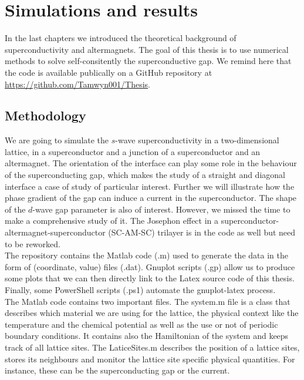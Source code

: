 \documentclass[../main.tex]{subfile}
\begin{document}
\section{Simulations and results}
In the last chapters we introduced the theoretical background of superconductivity and altermagnets. 
The goal of this thesis is to use numerical methods to solve self-consitently the superconductive gap.
We remind here that the code is available publically on a GitHub repository at \url{https://github.com/Tamwyn001/Thesis}.\\

\subsection{Methodology}\label{sec:Methodology}
We are going to simulate the $s$-wave superconductivity in a two-dimensional lattice,
in a superconductor and a junction of a superconductor and an altermagnet. 
The orientation of the interface can play some role in the behaviour of the superconducting gap, which 
makes the study of a straight and diagonal interface a case of study of particular interest. 
Further we will illustrate how the phase gradient of the gap can induce a current in the superconductor.
The shape of the $d$-wave gap parameter is also of interest. However, we missed the time to make a comprehensive study of it.
The Josephon effect in a superconductor-altermagnet-superconductor (SC-AM-SC) trilayer is in the code as well but need to be reworked.\\

The repository contains the Matlab code (.m) used to generate the data in the form of (coordinate, value) files (.dat).
Gnuplot scripts (.gp) allow us to produce some plots that we can then directly link to the Latex source code
of this thesis. Finally, some PowerShell scripts (.ps1) automate the gnuplot-latex process.\\

The Matlab code contains two important files. The system.m file is a class that describes which
 material we are using for the lattice, the physical context like the temperature and the chemical potential
as well as the use or not of periodic boundary conditions. It contains also the Hamiltonian of the system
and keeps track of all lattice sites.
The LaticeSites.m describes the position of a lattice sites, stores its neighbours and monitor the lattice
site specific physical quantities. For instance, these can be the superconducting gap or the current.
\end{document}
